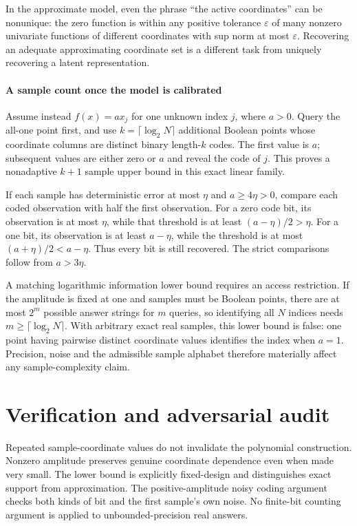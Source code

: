 \documentclass[11pt]{article}
\begin{document}
In the approximate model, even the phrase ``the active coordinates'' can be nonunique: the zero function is within any positive tolerance $\varepsilon$ of many nonzero univariate functions of different coordinates with sup norm at most $\varepsilon$. Recovering an adequate approximating coordinate set is a different task from uniquely recovering a latent representation.

\paragraph{A sample count once the model is calibrated}
Assume instead $f(x)=a x_j$ for one unknown index $j$, where $a>0$. Query the all-one point first, and use $k=\lceil\log_2N\rceil$ additional Boolean points whose coordinate columns are distinct binary length-$k$ codes. The first value is $a$; subsequent values are either zero or $a$ and reveal the code of $j$. This proves a nonadaptive $k+1$ sample upper bound in this exact linear family.

If each sample has deterministic error at most $\eta$ and $a\geq4\eta>0$, compare each coded observation with half the first observation. For a zero code bit, its observation is at most $\eta$, while that threshold is at least $(a-\eta)/2>\eta$. For a one bit, its observation is at least $a-\eta$, while the threshold is at most $(a+\eta)/2<a-\eta$. Thus every bit is still recovered. The strict comparisons follow from $a>3\eta$.

A matching logarithmic information lower bound requires an access restriction. If the amplitude is fixed at one and samples must be Boolean points, there are at most $2^m$ possible answer strings for $m$ queries, so identifying all $N$ indices needs $m\geq\lceil\log_2N\rceil$. With arbitrary exact real samples, this lower bound is false: one point having pairwise distinct coordinate values identifies the index when $a=1$. Precision, noise and the admissible sample alphabet therefore materially affect any sample-complexity claim.

\section{Verification and adversarial audit}
Repeated sample-coordinate values do not invalidate the polynomial construction. Nonzero amplitude preserves genuine coordinate dependence even when made very small. The lower bound is explicitly fixed-design and distinguishes exact support from approximation. The positive-amplitude noisy coding argument checks both kinds of bit and the first sample's own noise. No finite-bit counting argument is applied to unbounded-precision real answers.
\end{document}
